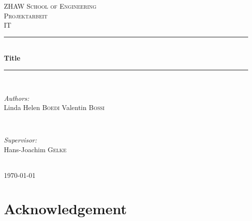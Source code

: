 \documentclass[12pt, a4paper]{report}
\begin{document}
    
    \begin{titlepage}
    
    \newcommand{\HRule}{\rule{\linewidth}{0.5mm}} %
    
    \center %
    
    \textsc{\LARGE ZHAW School of Engineering}\\[1.5cm] %
    \textsc{\Large Projektarbeit}\\[0.5cm] %
    \textsc{\large IT}\\[0.5cm] %
    
    \HRule \\[0.4cm]
    { \huge \bfseries Title}\\[0.4cm] %
    \HRule \\[1.5cm]
    
    
    \begin{minipage}{0.4\textwidth}
    \begin{flushleft} \large
    \emph{Authors:}\\
    Linda Helen \textsc{Boedi}  Valentin \textsc{Bossi} %
    \end{flushleft}
    \end{minipage}
    ~
    \begin{minipage}{0.4\textwidth}
    \begin{flushright} \large
    \emph{Supervisor:} \\
    Hans-Joachim  \textsc{Gelke} %
    \end{flushright}
    \end{minipage}\\[2cm]
    
    
    {\large \today}\\[2cm] 
    
    
    \vfill 
    
    \end{titlepage}
    
    \chapter*{Acknowledgement}
    
\end{document}
